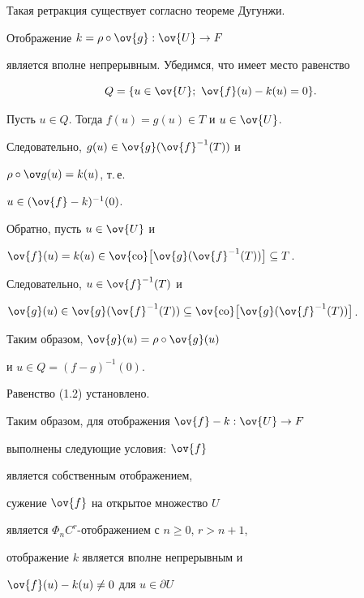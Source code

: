 Такая ретракция существует согласно теореме Дугунжи.





Отображение $k = \rho \circ \ov {g} : \ov {U} \to F$


является вполне непрерывным. Убедимся, что имеет место равенство


\begin{equation}


Q = \{u\in \ov {U} ;\ \ov {f}(u) - k(u) = 0 \}.


\end{equation}





Пусть $u\in Q$. Тогда $f(u) = g(u) \in T$ и $u \in \ov {U}$.


Следовательно, $g(u) \in \ov{g} (\ov{f}^{-1}(T))$ и


$\rho \circ \ov g(u) = {k}(u)$, т.\,е.


$u \in (\ov {f} - k)^{-1}(0)$.


Обратно, пусть $u \in \ov {U}$ и


$\ov {f}(u) = k(u) \in \ov {\co} 


\bigl[\ov{g} (\ov{f}^{-1}(T)) \bigr] \subseteq T$.


Следовательно, $u \in \ov {f}^{-1}(T)$ и 


$\ov {g}(u) \in \ov{g} (\ov{f}^{-1}(T))


\subseteq \ov {\co} 


\bigl[\ov{g} (\ov{f}^{-1}(T)) \bigr]$.


Таким образом, $\ov {g}(u) = \rho \circ \ov {g}(u)$


и $u \in Q = (f - g)^{-1}(0)$.


Равенство (1.2) установлено.





Таким образом, для отображения $\ov {f} - k : \ov {U} \to F$


выполнены следующие условия: $\ov {f}$


является собственным отображением,


сужение $\ov {f}$ на открытое множество $U$


является $\Phi_n C^r$-отображением с $n\geq 0$, $r > n+1$,


отображение $k$ является вполне непрерывным и 


$\ov {f}(u) - k(u) \ne 0$ для $u \in \partial U$


